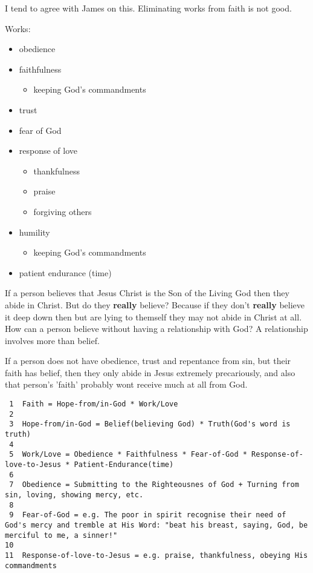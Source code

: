 \documentclass[11pt]{article}
\begin{document}
I tend to agree with James on this.
Eliminating works from faith is not good.

Works:
\begin{itemize}
\item obedience
\item faithfulness
\begin{itemize}
\item keeping God's commandments
\end{itemize}
\item trust
\item fear of God
\item response of love
\begin{itemize}
\item thankfulness
\item praise
\item forgiving others
\end{itemize}
\item humility
\begin{itemize}
\item keeping God's commandments
\end{itemize}
\item patient endurance (time)
\end{itemize}

If a person believes that Jesus Christ is the Son of the Living God then they abide in Christ.
But do they \textbf{really} believe? Because if they don't \textbf{really} believe it deep down then but are lying to themself they may not abide in Christ at all.
How can a person believe without having a relationship with God? A relationship involves more than belief.

If a person does not have obedience, trust and
repentance from sin, but their faith has belief, then they only
abide in Jesus extremely precariously, and also that person's 'faith' probably wont receive much at all from God.

\begin{verbatim}
 1  Faith = Hope-from/in-God * Work/Love
 2  
 3  Hope-from/in-God = Belief(believing God) * Truth(God's word is truth)
 4  
 5  Work/Love = Obedience * Faithfulness * Fear-of-God * Response-of-love-to-Jesus * Patient-Endurance(time)
 6  
 7  Obedience = Submitting to the Righteousnes of God + Turning from sin, loving, showing mercy, etc.
 8  
 9  Fear-of-God = e.g. The poor in spirit recognise their need of God's mercy and tremble at His Word: "beat his breast, saying, God, be merciful to me, a sinner!"
10  
11  Response-of-love-to-Jesus = e.g. praise, thankfulness, obeying His commandments
\end{verbatim}
\end{document}
